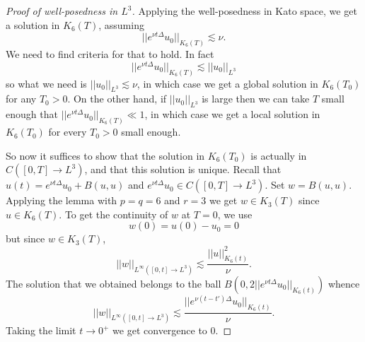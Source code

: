 \documentclass[12pt]{book}
\theoremstyle{definition}
\begin{document}
\begin{proof}[Proof of well-posedness in $L^3$]
Applying the well-posedness in Kato space, we get a solution in $K_6(T)$, assuming
$$||e^{\nu t \Delta} u_0||_{K_6(T)} \lesssim \nu.$$
We need to find criteria for that to hold. In fact
$$||e^{\nu t \Delta} u_0||_{K_6(T)} \lesssim ||u_0||_{L^3}$$
so what we need is $||u_0||_{L^3} \lesssim \nu$, in which case we get a global solution in $K_6(T_0)$ for any $T_0 > 0$.
On the other hand, if $||u_0||_{L^3}$ is large then we can take $T$ small enough that $||e^{\nu t \Delta} u_0||_{K_6(T)} \ll 1$, in which case we get a local solution in $K_6(T_0)$ for every $T_0 > 0$ small enough.

So now it suffices to show that the solution in $K_6(T_0)$ is actually in $C([0, T] \to L^3)$, and that this solution is unique.
Recall that $u(t) = e^{\nu t \Delta} u_0 + B(u, u)$ and $e^{\nu t \Delta} u_0 \in C([0, T] \to L^3)$. Set $w = B(u, u)$.
Applying the lemma with $p = q = 6$ and $r = 3$ we get $w \in K_3(T)$ since $u \in K_6(T)$.
To get the continuity of $w$ at $T = 0$, we use
$$w(0) = u(0) - u_0 = 0$$
but since $w \in K_3(T)$,
$$||w||_{L^\infty([0, t] \to L^3)} \lesssim \frac{||u||_{K_6(t)}^2}{\nu}.$$
The solution that we obtained belongs to the ball $B(0, 2||e^{\nu t \Delta} u_0||_{K_6(t)})$ whence
$$||w||_{L^\infty([0, t] \to L^3)} \lesssim \frac{||e^{\nu (t - t') \Delta} u_0||_{K_6(t)}}{\nu}.$$
Taking the limit $t \to 0^+$ we get convergence to $0$.


\end{proof}
\end{document}

